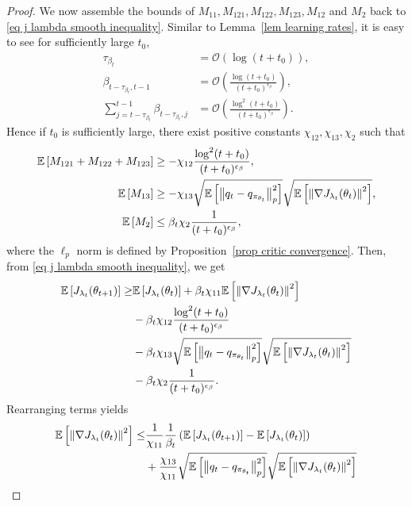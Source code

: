 \documentclass[twoside,11pt]{article}
\newcommand{\fO}{\mathcal{O}}
\newcommand{\E}{\mathbb{E}}
\numberwithin{assucounter}{section}
\begin{document}
\begin{proof}
We now assemble the bounds of $M_{11}, M_{121}, M_{122}, M_{123}, M_{12}$ and $M_2$ back to \eqref{eq j lambda smooth inequality}.
Similar to Lemma~\ref{lem learning rates},
it is easy to see for sufficiently large $t_0$,
\begin{align}
  \label{eq asymptotic learning rates beta}
  \tau_{\beta_t} &= \fO\left(\log (t+t_0)\right), \\
  \beta_{t-\tau_{\beta_t}, t-1} &= \fO\left(\frac{\log (t+t_0)}{(t+t_0)^{\epsilon_\beta}}\right), \\
  \sum_{j=t-\tau_{\beta_t}}^{t-1} \beta_{t-\tau_{\beta_t}, j} &= \fO\left(\frac{\log^2(t+t_0)}{(t+t_0)^{\epsilon_\beta}}\right).
\end{align}
Hence if $t_0$ is sufficiently large,
there exist positive constants $\chi_{12}, \chi_{13}, \chi_2$ such that
\begin{align}
  \E\left[M_{121} + M_{122} + M_{123}\right] &\geq -\chi_{12} \frac{\log^2(t+t_0)}{(t+t_0)^{\epsilon_\beta}}, \\
  \E\left[M_{13}\right] &\geq -\chi_{13}\sqrt{\E\left[\norm{q_t - q_{\pi_{\theta_t}}}_p^2 \right]} \sqrt{\E\left[\norm{\nabla J_{\lambda_t}(\theta_t)}^2\right]}, \\
  \E\left[M_2\right] &\leq \beta_t \chi_2 \frac{1}{(t+t_0)^{\epsilon_\beta}},
\end{align}
where the $\ell_p$ norm is defined by Proposition~\ref{prop critic convergence}.
Then, from \eqref{eq j lambda smooth inequality}, we get
\begin{align}
  \label{eq actor perf recursive bound}
  \E\left[J_{\lambda_t}(\theta_{t+1})\right] \geq& \E\left[J_{\lambda_t}(\theta_t)\right] + \beta_t \chi_{11} \E\left[\norm{\nabla J_{\lambda_t}(\theta_t)}^2\right] \\
  &-\beta_t \chi_{12} \frac{\log^2(t+t_0)}{(t+t_0)^{\epsilon_\beta}} \\
  &-\beta_t \chi_{13}\sqrt{\E\left[\norm{q_t - q_{\pi_{\theta_t}}}_p^2 \right]} \sqrt{\E\left[\norm{\nabla J_{\lambda_t}(\theta_t)}^2\right]} \\
  &- \beta_t \chi_2 \frac{1}{(t+t_0)^{\epsilon_\beta}}.
\end{align}
Rearranging terms yields
\begin{align}
  \E\left[\norm{\nabla J_{\lambda_t}(\theta_t)}^2\right] \leq& \frac{1}{\chi_{11}} \frac{1}{\beta_t} \left(\E\left[J_{\lambda_t}(\theta_{t+1})\right] - \E\left[J_{\lambda_t}(\theta_t)\right]\right) \\
  &+ \frac{\chi_{13}}{\chi_{11}} \sqrt{\E\left[\norm{q_t - q_{\pi_{\theta_t}}}_p^2 \right]} \sqrt{\E\left[\norm{\nabla J_{\lambda_t}(\theta_t)}^2\right]} \\

\end{align}
\end{proof}
\end{document}
